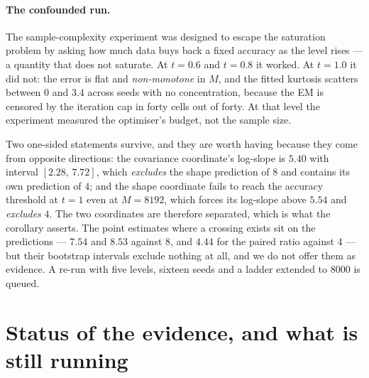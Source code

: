 \documentclass[11pt,a4paper]{article}
\begin{document}
\paragraph{The confounded run.} The sample-complexity experiment was designed to escape the
saturation problem by asking how much data buys back a fixed accuracy as the level rises --- a
quantity that does not saturate. At $t=0.6$ and $t=0.8$ it worked. At $t=1.0$ it did not: the
error is flat and \emph{non-monotone} in $M$, and the fitted kurtosis scatters between $0$ and
$3.4$ across seeds with no concentration, because the EM is censored by the iteration cap in forty
cells out of forty. At that level the experiment measured the optimiser's budget, not the sample
size.

Two one-sided statements survive, and they are worth having because they come from opposite
directions: the covariance coordinate's log-slope is $5.40$ with interval $[2.28,\,7.72]$, which
\emph{excludes} the shape prediction of $8$ and contains its own prediction of $4$; and the shape
coordinate fails to reach the accuracy threshold at $t=1$ even at $M=8192$, which forces its
log-slope above $5.54$ and \emph{excludes} $4$. The two coordinates are therefore separated, which
is what the corollary asserts. The point estimates where a crossing exists sit on the predictions
--- $7.54$ and $8.53$ against $8$, and $4.44$ for the paired ratio against $4$ --- but their
bootstrap intervals exclude nothing at all, and we do not offer them as evidence. A re-run with
five levels, sixteen seeds and a ladder extended to $8000$ is queued.

\section{Status of the evidence, and what is still running}\label{sec:status}
\end{document}
